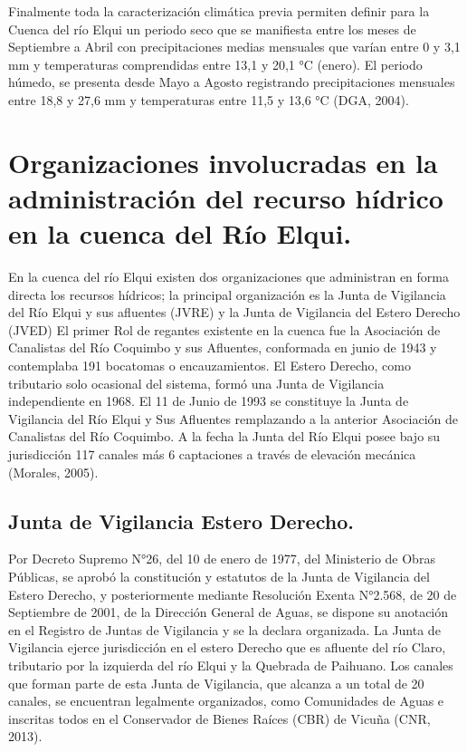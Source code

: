 \documentclass[11pt,]{article}
\begin{document}
Finalmente toda la caracterización climática previa permiten definir para la Cuenca del río Elqui un  periodo seco que se manifiesta entre los meses de Septiembre a Abril con precipitaciones medias mensuales que varían entre 0 y 3,1 mm y temperaturas comprendidas entre 13,1 y 20,1 °C (enero). El periodo húmedo, se presenta desde Mayo a Agosto registrando precipitaciones mensuales entre 18,8 y 27,6 mm y temperaturas entre 11,5 y 13,6 °C (DGA, 2004).

\section{Organizaciones involucradas en la administración del recurso hídrico en la cuenca del Río Elqui.}
En la cuenca del río Elqui existen dos organizaciones que administran en forma directa los recursos hídricos; la principal organización es la Junta de Vigilancia del Río Elqui y sus afluentes (JVRE) y la Junta de Vigilancia del Estero Derecho (JVED)
El primer Rol de regantes existente en la cuenca fue la Asociación de Canalistas del Río Coquimbo y sus Afluentes, conformada en junio de 1943 y contemplaba 191 bocatomas o encauzamientos.  El Estero Derecho, como tributario solo ocasional del sistema, formó una Junta de Vigilancia independiente en 1968. El 11 de Junio de 1993 se constituye la Junta de Vigilancia del Río Elqui y Sus Afluentes remplazando a la anterior Asociación de Canalistas del Río Coquimbo. A la fecha la Junta del Río Elqui posee bajo su jurisdicción 117 canales más 6 captaciones a través de elevación mecánica (Morales, 2005).

\subsection{Junta de Vigilancia Estero Derecho.}
Por Decreto Supremo N°26, del 10 de enero de 1977, del Ministerio de Obras Públicas, se aprobó la constitución y estatutos de la Junta de Vigilancia del Estero Derecho, y posteriormente mediante Resolución Exenta N°2.568, de 20 de Septiembre de 2001, de la Dirección General de Aguas, se dispone su anotación en el Registro de Juntas de Vigilancia y se la declara organizada.
La Junta de Vigilancia ejerce jurisdicción en el estero Derecho que es afluente del río Claro, tributario por la izquierda del río Elqui y la Quebrada de Paihuano. 
Los canales que forman parte de esta Junta de Vigilancia, que alcanza a un total de 20 canales, se encuentran legalmente organizados, como Comunidades de Aguas e inscritas todos en el Conservador de Bienes Raíces (CBR) de Vicuña (CNR, 2013).
\end{document}
